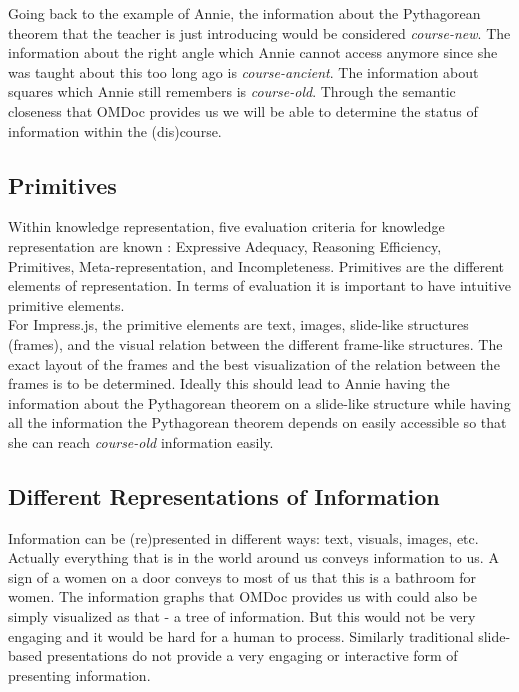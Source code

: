 \documentclass[twoside]{article}
\begin{document}
Going back to the example of Annie, the information about the Pythagorean theorem that the teacher is just introducing would be considered \textit{course-new}. The information about the right angle which Annie cannot access anymore since she was taught about this too long ago is \textit{course-ancient}. The information about squares which Annie still remembers is \textit{course-old}. Through the semantic closeness that OMDoc provides us we will be able to determine the status of information within the (dis)course. \\

\subsection{Primitives}

Within knowledge representation, five evaluation criteria for knowledge representation are known \cite{Kohlhase:Complog:base}: Expressive Adequacy, Reasoning Efficiency, Primitives, Meta-representation, and Incompleteness. Primitives are the different elements of representation. In terms of evaluation it is important to have intuitive primitive elements. \\

For Impress.js, the primitive elements are text, images, slide-like structures (frames), and the visual relation between the different frame-like structures. The exact layout of the frames and the best visualization of the relation between the frames is to be determined. Ideally this should lead to Annie having the information about the Pythagorean theorem on a slide-like structure while having all the information the Pythagorean theorem depends on easily accessible so that she can reach \textit{course-old} information easily.  

\subsection{Different Representations of Information}

Information can be (re)presented in different ways: text, visuals, images, etc. Actually everything that is in the world around us conveys information to us. A sign of a women on a door conveys to most of us that this is a bathroom for women. The information graphs that OMDoc provides us with could also be simply visualized as that - a tree of information. But this would not be very engaging and it would be hard for a human to process. Similarly traditional slide-based presentations do not provide a very engaging or interactive form of presenting information. \\  
\end{document}
